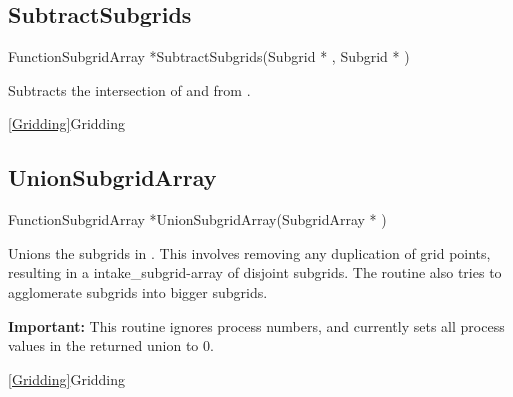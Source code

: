 
\newpage
\subsection{SubtractSubgrids}
\label{SubtractSubgrids}


\begin{deftypefn}{Function}{SubgridArray *}{SubtractSubgrids}({Subgrid *} , {Subgrid *} )

\DESCRIPTION
Subtracts the intersection of  and 
from .

\SEEALSO
\vref{Gridding}{Gridding}

\end{deftypefn}


\newpage
\subsection{UnionSubgridArray}
\label{UnionSubgridArray}


\begin{deftypefn}{Function}{SubgridArray *}{UnionSubgridArray}({SubgridArray *} )

\DESCRIPTION
Unions the subgrids in .
This involves removing any duplication of grid points, resulting in
a intake_subgrid-array of disjoint subgrids.
The routine also tries to agglomerate subgrids into bigger subgrids.

\NOTES
{\bf Important:} This routine ignores process numbers, and currently
sets all process values in the returned union to 0.

\SEEALSO
\vref{Gridding}{Gridding}

\end{deftypefn}

